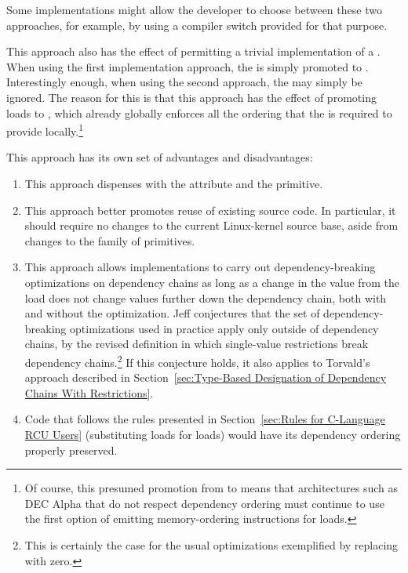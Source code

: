 \documentclass[letterpaper,twocolumn,10pt]{article}
\begin{document}
Some implementations might allow the developer to choose between these
two approaches, for example, by using a compiler switch provided for
that purpose.

This approach also has the effect of permitting a trivial implementation
of a  .
When using the first implementation approach, the 
is simply promoted to .
Interestingly enough, when using the second approach, the
  may simply be ignored.
The reason for this is that this approach has the effect of promoting
 loads to , which
already globally enforces all the ordering that the
  is required to
provide locally.\footnote{
	Of course, this presumed promotion from 
	to  means that architectures such as
	DEC Alpha that do not respect dependency ordering must continue
	to use the first option of emitting memory-ordering instructions
	for  loads.}

This approach has its own set of advantages and disadvantages:

\begin{enumerate}
\item	This approach dispenses with the 
	attribute and the  primitive.
\item	This approach better promotes reuse of existing source code.
	In particular, it should require no changes to the current
	Linux-kernel source base, aside from changes to the
	 family of primitives.
\item	This approach allows implementations to carry out dependency-breaking
	optimizations on dependency chains as long as a change in
	the value from the  load does not change
	values further down the dependency chain, both with and without
	the optimization.
	Jeff conjectures that the set of dependency-breaking optimizations
	used in practice apply only outside of dependency chains, by
	the revised definition in which single-value restrictions break
	dependency chains.\footnote{
		This is certainly the case for the usual optimizations
		exemplified by replacing  with zero.}
	If this conjecture holds, it also applies to Torvald's
	approach described in
	Section~\ref{sec:Type-Based Designation of Dependency Chains With Restrictions}.
\item	Code that follows the rules presented in
	Section~\ref{sec:Rules for C-Language RCU Users}
	(substituting  loads for
	 loads)
	would have its dependency ordering properly preserved.
\end{enumerate}
\end{document}
